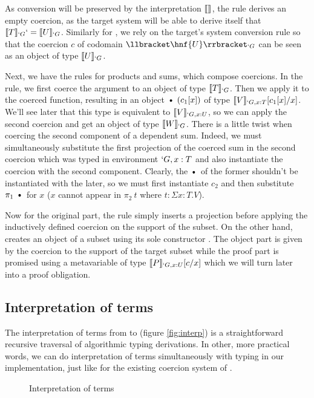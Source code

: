 \documentclass{llncs}
\begin{document}
As conversion will be preserved by the interpretation $\llbracket  \rrbracket_{}$,
the rule  derives an empty coercion, as the target system
will be able to derive itself that $\llbracket T \rrbracket_{`G} `= \llbracket U \rrbracket_{`G}$.
Similarly for , we rely on the target's system conversion
rule so that the coercion $c$ of codomain $\ip{\hnf{U}}{`G}$ can be seen
as an object of type $\llbracket U \rrbracket_{`G}$.

Next, we have the rules for products and sums, which compose
coercions. In the  rule, we first coerce the argument to
an object of type $\llbracket T \rrbracket_{`G}$. Then we apply it to the coerced
function, resulting in an object $\ctxdot~(c_1[x])$ of type
$\llbracket V \rrbracket_{`G, x : T}[c_1[x]/x]$. We'll see later that this type is equivalent to
$\llbracket V \rrbracket_{`G, x : U}$, so we can apply the second coercion and get an
object of type $\llbracket W \rrbracket_{`G}$. There is a little twist when coercing the
second component of a dependent sum. Indeed, we must simultaneously
substitute the first projection of the coerced sum in the second
coercion which was typed in environment $`G, x : T$ and also instantiate
the coercion with the second component. Clearly, the $\ctxdot$ of the
former shouldn't be instantiated with the later, so we must first
instantiate $c_2$ and then substitute $\pi_1~\ctxdot$ for $x$ 
($x$ cannot appear in $\pi_2~t$ where $t : \Sigma x : T.V$).

Now for the original part, the  rule simply inserts a
projection before applying the inductively defined coercion on the
support of the subset. On the other hand,  creates an
object of a subset using its sole constructor . The object
part is given by the coercion to the support of the target subset
while the proof part is promised using a metavariable of type $\llbracket P \rrbracket_{`G, x : U}[c/x]$ which
we will turn later into a proof obligation. 

\subsection{Interpretation of terms}
The interpretation of terms from \Russell to \CICq (figure
\vref{fig:interp}) is a straightforward
recursive traversal of algorithmic typing derivations. In other, more
practical words, we can do interpretation of terms simultaneously with
typing in our implementation, just like for the existing coercion system
of \Coq. 

\begin{figure}[ht]
  \vspace{-2em}
  \interparr
  \vspace{-2em}
  \caption{Interpretation of terms}
  \label{fig:interp}
  \vspace{-1em}
\end{figure}
\end{document}
